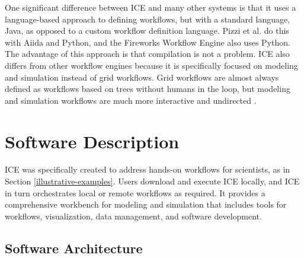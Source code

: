 One significant difference between ICE and many other systems is that it uses a language-based approach to defining workflows, but with a standard language, Java, as opposed to a custom workflow definition language. Pizzi et al. do this with Aiida and Python, and the Fireworks Workflow Engine also uses Python. The advantage of this approach is that compilation is not a problem. ICE also differs from other workflow engines because it is specifically focused on modeling and simulation instead of grid workflows. Grid workflows are almost always defined as workflows based on trees without humans in the loop, but modeling and simulation workflows are much more interactive and undirected \cite{billings_toward_2017}. 

\section{Software Description}\label{software-description}

ICE was specifically created to address hands-on workflows for scientists, as in Section \ref{illustrative-examples}. Users download and
execute ICE locally, and ICE in turn orchestrates local or remote workflows as
required. It provides a comprehensive workbench for modeling and
simulation that includes tools for workflows, visualization, data
management, and software development.

\subsection{Software Architecture}\label{software-architecture}

